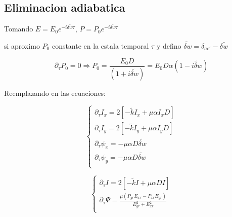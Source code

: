 		\subsection{Eliminacion adiabatica}
			
		Tomando $E=E_0 e^{-i\bar{\delta w} \tau }$, $P=P_0 e^{-i\bar{\delta w} \tau }$
		 
		si aproximo $P_0$ constante en la estala temporal $\tau$ y defino $\tilde{\delta w }=\delta_{ac'}-\bar{\delta w}$
		
		
		\[\partial_{\tau}P_0=0 \Longrightarrow P_0=\frac{E_0 D}{(1+i\tilde{\delta w })}=E_0 D \alpha(1-\tilde{i\delta w })	\]
		
		
		Reemplazando en las ecuaciones:
		
			\begin{equation}
				\begin{cases}
					\partial_{\tau}I_x=2[-\tilde{k} I_x +\mu\alpha I_x D]  \\
					\partial_{\tau}I_y=2[-\tilde{k} I_y +\mu\alpha I_y D]  \\
					\partial_{\tau}\psi_x  = -\mu \alpha D \tilde{\delta w} \\
					\partial_{\tau}\psi_y  = -\mu \alpha D \tilde{\delta w} \\
				\end{cases}	
			\end{equation}
		
			\begin{equation}
				\begin{cases}
					\partial_{\tau}I=2[-\tilde{k} I +\mu \alpha D I ] \\
					\partial_{\tau}\Psi  = \frac{\mu(P_{yr}E_{xr}-P_{xr}E_{yr})}{E^2_{yr}+E^2_{xr}}\\
				\end{cases}
			\end{equation}
